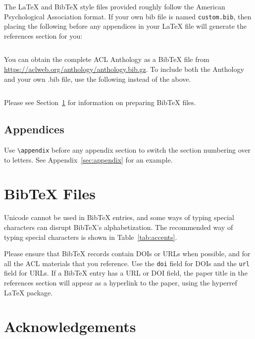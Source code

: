 \documentclass[11pt]{article}
\begin{document}
\nocite{Ando2005,andrew2007scalable,rasooli-tetrault-2015}

The \LaTeX{} and Bib\TeX{} style files provided roughly follow the American Psychological Association format.
If your own bib file is named \texttt{custom.bib}, then placing the following before any appendices in your \LaTeX{} file will generate the references section for you:
\begin{quote}
\begin{verbatim}

\end{verbatim}
\end{quote}

You can obtain the complete ACL Anthology as a Bib\TeX{} file from \url{https://aclweb.org/anthology/anthology.bib.gz}.
To include both the Anthology and your own .bib file, use the following instead of the above.
\begin{quote}
\begin{verbatim}

\end{verbatim}
\end{quote}

Please see Section~\ref{sec:bibtex} for information on preparing Bib\TeX{} files.

\subsection{Appendices}

Use \verb|\appendix| before any appendix section to switch the section numbering over to letters. See Appendix~\ref{sec:appendix} for an example.

\section{Bib\TeX{} Files}
\label{sec:bibtex}

Unicode cannot be used in Bib\TeX{} entries, and some ways of typing special characters can disrupt Bib\TeX's alphabetization. The recommended way of typing special characters is shown in Table~\ref{tab:accents}.

Please ensure that Bib\TeX{} records contain DOIs or URLs when possible, and for all the ACL materials that you reference.
Use the \verb|doi| field for DOIs and the \verb|url| field for URLs.
If a Bib\TeX{} entry has a URL or DOI field, the paper title in the references section will appear as a hyperlink to the paper, using the hyperref \LaTeX{} package.

\section*{Acknowledgements}
\end{document}
